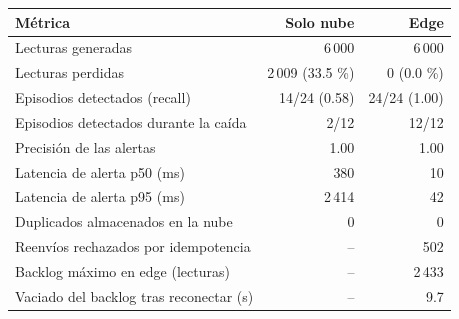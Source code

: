 \begin{tabularx}{\textwidth}{@{}Lrr@{}}
\toprule
\textbf{Métrica} & \textbf{Solo nube} & \textbf{Edge} \\
\midrule
Lecturas generadas & 6\,000 & 6\,000 \\
Lecturas perdidas & 2\,009 (33.5 \%) & 0 (0.0 \%) \\
Episodios detectados (recall) & 14/24 (0.58) & 24/24 (1.00) \\
Episodios detectados durante la caída & 2/12 & 12/12 \\
Precisión de las alertas & 1.00 & 1.00 \\
Latencia de alerta p50 (ms) & 380 & 10 \\
Latencia de alerta p95 (ms) & 2\,414 & 42 \\
Duplicados almacenados en la nube & 0 & 0 \\
Reenvíos rechazados por idempotencia & -- & 502 \\
Backlog máximo en edge (lecturas) & -- & 2\,433 \\
Vaciado del backlog tras reconectar (s) & -- & 9.7 \\
\bottomrule
\end{tabularx}
